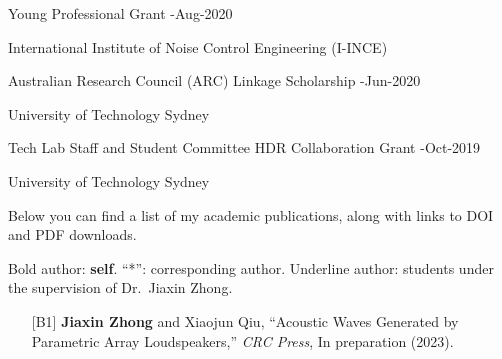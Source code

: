 \documentclass[10pt,a4paper,ragged2e,withhyper]{altacv}
\newcommand{\PubMe}[1]{\textbf{#1}}
\begin{document}
\divider

{\color{accent}Young Professional Grant}
\hfill {}-Aug-2020
\par
International Institute of Noise Control Engineering (I-INCE)

\divider

{\color{accent}Australian Research Council (ARC) Linkage Scholarship}
\hfill {}-Jun-2020
\par
University of Technology Sydney

\divider

{\color{accent}Tech Lab Staff and Student Committee HDR Collaboration Grant}
\hfill {}-Oct-2019
\par
University of Technology Sydney


\newpage
{}

Below you can find a list of my academic publications, along with links to {\color{accent}\aiDoi} DOI and {\color{accent}\faFilePdf[regular]} PDF downloads.

Bold author: \textbf{self}.
``*'': corresponding author.
Underline author: students under the supervision of Dr.\ Jiaxin Zhong.

\vspace{.5cm}


\begin{itemize}[leftmargin = 25pt]
    \justifying 
    \item[{[B1]}] \PubMe{Jiaxin Zhong} and Xiaojun Qiu, 
    ``Acoustic Waves Generated by Parametric Array Loudspeakers,'' 
    \textit{CRC Press}, In preparation (2023).
\end{itemize}

\divider


\end{document}
